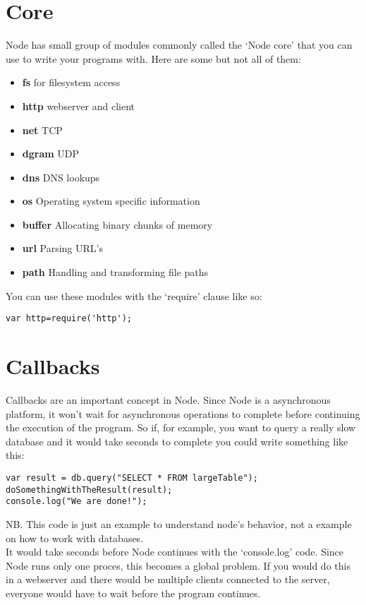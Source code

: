 \documentclass[a4paper]{report}
\begin{document}
\section*{Core}
Node has small group of modules commonly called the `Node core' that you can use to write your programs with. Here are some but not all of them:
\begin{itemize}
	\item \textbf{fs} for filesystem access
	\item \textbf{http} webserver and client
	\item \textbf{net} TCP 
	\item \textbf{dgram} UDP
	\item \textbf{dns} DNS lookups
	\item \textbf{os} Operating system specific information
	\item \textbf{buffer} Allocating binary chunks of memory
	\item \textbf{url} Parsing URL's
	\item \textbf{path} Handling and transforming file paths
\end{itemize}

\noindent You can use these modules with the `require' clause like so: 
\begin{lstlisting}
var http=require('http');
\end{lstlisting}

\section*{Callbacks}
Callbacks are an important concept in Node. Since Node is a asynchronous platform, it won't wait for asynchronous operations to complete before continuing the execution of the program. So if, for example, you want to query a really slow database and it would take seconds to complete you could write something like this:
\begin{lstlisting}
var result = db.query("SELECT * FROM largeTable");
doSomethingWithTheResult(result);
console.log("We are done!");
\end{lstlisting}
NB. This code is just an example to understand node's behavior, not a example on how to work with databases.
\\
\noindent It would take seconds before Node continues with the `console.log' code. Since Node runs only one proces, this becomes a global problem. If you would do this in a webserver and there would be multiple clients connected to the server, everyone would have to wait before the program continues. 
\end{document}
